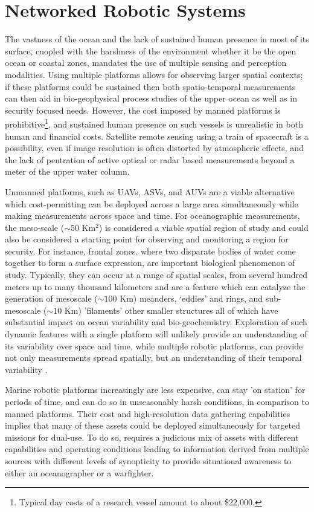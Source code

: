 \section{Networked Robotic Systems}
\label{sec:network}

The vastness of the ocean and the lack of sustained human presence in
most of its surface, cuopled with the harshness of the environment
whether it be the open ocean or coastal zones, mandates the use of
multiple sensing and perception modalities. Using multiple platforms
allows for observing larger spatial contexts; if these platforms could
be sustained then both spatio-temporal measurements can then aid in
bio-geophysical process studies of the upper ocean as well as in
security focused needs. However, the cost imposed by manned platforms
is prohibitive\footnote{Typical day costs of a research vessel amount
  to about \$22,000.}, and sustained human presence on such vessels is
unrealistic in both human and financial costs. Satellite remote
sensing using a train of spacecraft is a possibility, even if image
resolution is often distorted by atmospheric effects, and the lack of
pentration of active optical or radar based measurements beyond a
meter of the upper water column. 

Unmanned platforms, such as UAVs, ASVs, and AUVs are a viable
alternative which cost-permitting can be deployed across a large area
simultaneously while making measurements across space and time. For
oceanographic measurements, the meso-scale ($\sim 50$ Km$^2$) is
considered a viable spatial region of study and could also be
considered a starting point for observing and monitoring a region for
security. For instance, frontal zones, where two disparate bodies of
water come together to form a surface expression, are important
biological phenomenon of study. Typically, they can occur at a range
of spatial scales, from several hundred meters up to many thousand
kilometers \cite{belkin2007fronts} and are a feature which can
catalyze the generation of mesoscale ($\sim 100$ Km) meanders,
‘eddies’ and rings, and sub-mesoscale ($\sim 10$ Km) 'filaments' other
smaller structures all of which have substantial impact on ocean
variability and bio-geochemistry. Exploration of such dynamic features
with a single platform will unlikely provide an understanding of its
variability over space and time, while multiple robotic platforms, can
provide not only measurements spread spatially, but an understanding
of their temporal variability \cite{pinto20,pinto22}.

Marine robotic platforms increasingly are less expensive, can stay 'on
station' for periods of time, and can do so in unseasonably harsh
conditions, in comparison to manned platforms. Their cost and
high-resolution data gathering capabilities implies that many of these
assets could be deployed simultaneously for targeted missions for
dual-use. To do so, requires a judicious mix of assets with different
capabilities and operating conditions leading to information derived
from multiple sources with different levels of synopticity to provide
situational awareness to either an oceanographer or a warfighter. 

